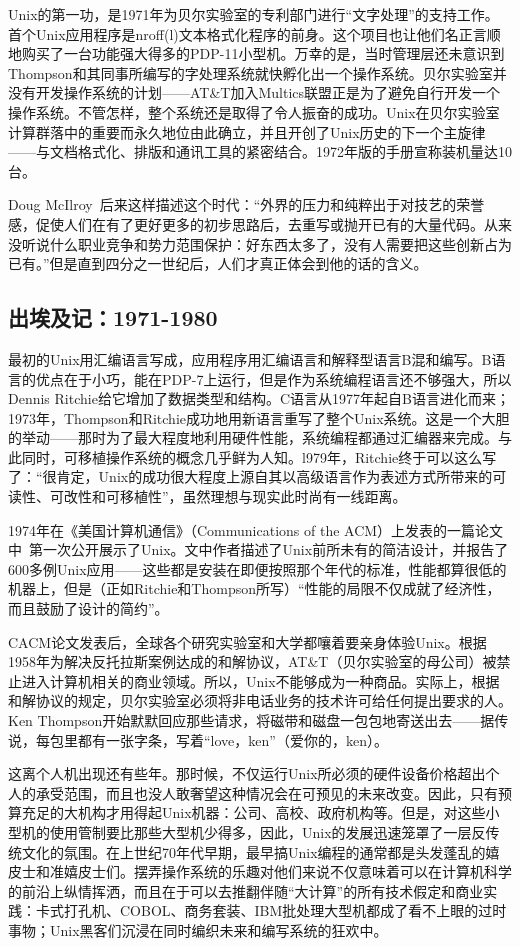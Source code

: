 \documentclass[12pt,oneside]{ctexbook}
\begin{document}
\begin{common-format}
Unix的第一功，是1971年为贝尔实验室的专利部门进行“文字处理”的支持工作。首个Unix应用程序是nroff(l)文本格式化程序的前身。这个项目也让他们名正言顺地购买了一台功能强大得多的PDP-11小型机。万幸的是，当时管理层还未意识到Thompson和其同事所编写的字处理系统就快孵化出一个操作系统。贝尔实验室并没有开发操作系统的计划——AT\&{}T加入Multics联盟正是为了避免自行开发一个操作系统。不管怎样，整个系统还是取得了令人振奋的成功。Unix在贝尔实验室计算群落中的重要而永久地位由此确立，并且开创了Unix历史的下一个主旋律——与文档格式化、排版和通讯工具的紧密结合。1972年版的手册宣称装机量达10台。

Doug McIlroy~\cite{McIlroy91}后来这样描述这个时代：“外界的压力和纯粹出于对技艺的荣誉感，促使人们在有了更好更多的初步思路后，去重写或抛开已有的大量代码。从来没听说什么职业竞争和势力范围保护：好东西太多了，没有人需要把这些创新占为已有。”但是直到四分之一世纪后，人们才真正体会到他的话的含义。


\subsection{出埃及记：1971-1980}
最初的Unix用汇编语言写成，应用程序用汇编语言和解释型语言B混和编写。B语言的优点在于小巧，能在PDP-7上运行，但是作为系统编程语言还不够强大，所以Dennis Ritchie给它增加了数据类型和结构。C语言从1977年起自B语言进化而来；1973年，Thompson和Ritchie成功地用新语言重写了整个Unix系统。这是一个大胆的举动——那时为了最大程度地利用硬件性能，系统编程都通过汇编器来完成。与此同时，可移植操作系统的概念几乎鲜为人知。l979年，Ritchie终于可以这么写了：“很肯定，Unix的成功很大程度上源自其以高级语言作为表述方式所带来的可读性、可改性和可移植性”，虽然理想与现实此时尚有一线距离。

1974年在《美国计算机通信》（Communications of the ACM）上发表的一篇论文中~\cite{Ritchie-Thompson}第一次公开展示了Unix。文中作者描述了Unix前所未有的简洁设计，并报告了600多例Unix应用——这些都是安装在即便按照那个年代的标准，性能都算很低的机器上，但是（正如Ritchie和Thompson所写）“性能的局限不仅成就了经济性，而且鼓励了设计的简约”。

CACM论文发表后，全球各个研究实验室和大学都嚷着要亲身体验Unix。根据1958年为解决反托拉斯案例达成的和解协议，AT\&{}T（贝尔实验室的母公司）被禁止进入计算机相关的商业领域。所以，Unix不能够成为一种商品。实际上，根据和解协议的规定，贝尔实验室必须将非电话业务的技术许可给任何提出要求的人。Ken Thompson开始默默回应那些请求，将磁带和磁盘一包包地寄送出去——据传说，每包里都有一张字条，写着“love，ken”（爱你的，ken）。

这离个人机出现还有些年。那时候，不仅运行Unix所必须的硬件设备价格超出个人的承受范围，而且也没人敢奢望这种情况会在可预见的未来改变。因此，只有预算充足的大机构才用得起Unix机器：公司、高校、政府机构等。但是，对这些小型机的使用管制要比那些大型机少得多，因此，Unix的发展迅速笼罩了一层反传统文化的氛围。在上世纪70年代早期，最早搞Unix编程的通常都是头发蓬乱的嬉皮士和准嬉皮士们。摆弄操作系统的乐趣对他们来说不仅意味着可以在计算机科学的前沿上纵情挥洒，而且在于可以去推翻伴随“大计算”的所有技术假定和商业实践：卡式打孔机、COBOL、商务套装、IBM批处理大型机都成了看不上眼的过时事物；Unix黑客们沉浸在同时编织未来和编写系统的狂欢中。


\end{common-format}
\end{document}
